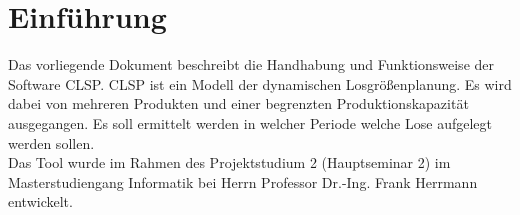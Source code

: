 \documentclass[12pt,a4paper, listof=entryprefix, bibliography=totocnumbered,toc=listofnumbered,lof=listofnumbered]{scrartcl}
\newcounter{verzeichnis}
\begin{document}
\singlespacing %
\setcounter{section}{0}
\setcounter{page}{1}

\tableofcontents %
\pagebreak

\onehalfspacing %
\renewcommand{\thesection}{\arabic{section}} %
\setcounter{page}{1}	%
\setcounter{section}{0}
\renewcommand{\sectionmark}[1]{\markright{#1}} %
\renewcommand{\subsectionmark}[1]{}            %
\renewcommand{\subsubsectionmark}[1]{}         %
\rhead{\rightmark}                             %

\section{Einführung}
\label{ch:einfuehrung}
Das vorliegende Dokument beschreibt die Handhabung und Funktionsweise der Software \gls{CLSP}. \gls{CLSP} ist ein Modell der dynamischen Losgrößenplanung. Es wird dabei von mehreren Produkten und einer begrenzten Produktionskapazität ausgegangen. Es soll ermittelt werden in welcher Periode welche Lose aufgelegt werden sollen.\\
Das Tool wurde im Rahmen des Projektstudium 2 (Hauptseminar 2) im Masterstudiengang Informatik bei Herrn Professor Dr.-Ing. Frank Herrmann entwickelt. 



\pagebreak

\end{document}
